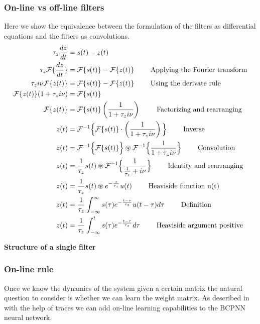 \documentclass[10pt,a4paper]{article}
\begin{document}
\subsubsection{On-line vs off-line filters}
Here we show the equivalence between the formulation of the filters as differential equations and the filters as convolutions. 
\begin{align*}
\tau_z \dfrac{dz}{dt} &= s(t) - z(t) \\
\tau_z \mathcal{F}\{\dfrac{dz}{dt}\} &= \mathcal{F}\{s(t)\} -  \mathcal{F}\{ z(t) \}  \text{ \qquad Applying the Fourier transform} \\
\tau_z i \nu \mathcal{F}\{ z(t) \} &=  \mathcal{F}\{s(t)\} -  \mathcal{F}\{ z(t) \}  \text{ \qquad Using the derivate rule} \\
\mathcal{F}\{ z(t) \}(1 + \tau_z i \nu) &= \mathcal{F}\{s(t)\} \\ 
\mathcal{F}\{ z(t) \} &= \mathcal{F}\{s(t)\} \left(\frac{1}{1 +\tau_z i \nu } \right) \text{ \qquad Factorizing and rearranging} \\ 
z(t) &= \mathcal{F}^{-1} \Big\{ \mathcal{F}\{s(t)\} \cdot \left(\frac{1}{1 +\tau_z i \nu } \right) \Big\} \text{ \qquad Inverse}  \\ 
z(t) &= \mathcal{F}^{-1} \Big\{ \mathcal{F}\{s(t)\} \Big\} \circledast \mathcal{F}^{-1} \Big\{  \frac{1}{1 +\tau_z i \nu } \Big\} \text{ \qquad Convolution}  \\ 
z(t) &= \frac{1}{\tau_z } s(t) \circledast \mathcal{F}^{-1} \Big\{  \frac{1}{\frac{1}{\tau_z } + i \nu } \Big\} \text{ \qquad Identity and rearranging}  \\ 
z(t) &= \frac{1}{\tau_z } s(t) \circledast e^{-\frac{t}{\tau_z}}u(t)  \text{ \qquad Heaviside function u(t)}  \\ 
z(t) &= \frac{1}{\tau_z } \int_{-\infty}^{\infty} s(\tau) e^{-\frac{t - \tau}{\tau_z}}u(t - \tau) d\tau  \text{ \qquad Definition}  \\ 
z(t) &= \frac{1}{\tau_z } \int_{-\infty}^{t} s(\tau) e^{-\frac{t - \tau}{\tau_z}} d\tau  \text{ \qquad Heaviside argument positive}
\end{align*}

\textbf{Structure of a single filter}


\subsubsection{On-line rule}
Once we know the dynamics of the system given a certain matrix the natural question to consider is whether we can learn the weight matrix. As described in \cite{sandberg2002bayesian} with the help of traces we can add on-line learning capabilities to the BCPNN neural network. 
\end{document}
